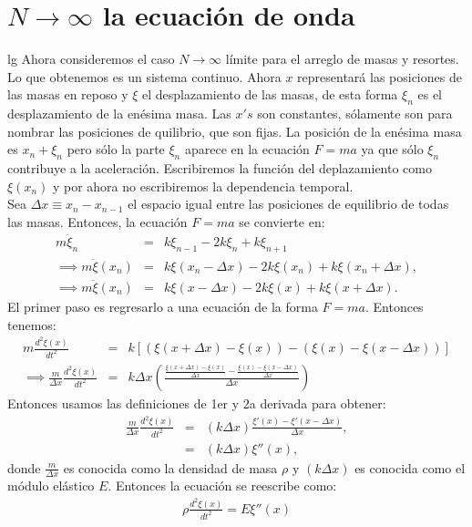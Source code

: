 \documentclass[letterpaper,12pt,oneside]{book}
\begin{document}
\section{\texorpdfstring{$N \to \infty$} y la ecuaci\'on de onda}{lg}
Ahora consideremos el caso $N \to \infty$ l\'imite para el arreglo de masas y resortes. Lo que obtenemos es un sistema continuo. Ahora $x$ representar\'a las posiciones de las masas en reposo y $\xi$ el desplazamiento de las masas, de esta forma $\xi_n$ es el desplazamiento de la en\'esima masa. Las $x's$ son constantes, s\'olamente son para nombrar las posiciones de quilibrio, que son fijas. La posici\'on de la en\'esima masa es $x_n + \xi_n$ pero s\'olo la parte $\xi_n$ aparece en la ecuaci\'on $F=ma$ ya que s\'olo $\xi_n$ contribuye a la aceleraci\'on. Escribiremos la funci\'on del deplazamiento como $\xi(x_n)$ y por ahora no escribiremos la dependencia temporal.\\
Sea $\Delta x \equiv x_n - x_{n-1}$ el espacio igual entre las posiciones de equilibrio de todas las masas. Entonces, la ecuaci\'on $F=ma$ se convierte en:
%
\begin{eqnarray}
m\ddot \xi_n &=& k\xi_{n-1}-2k\xi_n + k\xi_{n+1}\\
\implies m\ddot \xi(x_n) &=& k\xi(x_n-\Delta x)-2k\xi(x_n)+ k\xi(x_n + \Delta x),\\
\implies m\ddot \xi(x_n) &=& k\xi(x-\Delta x)-2k\xi(x)+ k\xi(x + \Delta x).
\end{eqnarray}
%
El primer paso es regresarlo a una ecuaci\'on de la forma $F=ma$. Entonces tenemos:
%
\begin{eqnarray}
m\frac{d^2\xi(x)}{dt^2}&=&k\left[(\xi (x+\Delta x)-\xi(x))-(\xi(x)-\xi(x-\Delta x)) \right]\\
\implies \frac{m}{\Delta x}\frac{d^2\xi(x)}{dt^2}&=&k\Delta x\left(\frac{\frac{\xi(x+\Delta x)-\xi(x)}{\Delta x}-\frac{\xi(x)-\xi(x-\Delta x)}{\Delta x}}{\Delta x} \right)
\end{eqnarray}
%
Entonces usamos las definiciones de 1er y 2a derivada para obtener:
%
\begin{eqnarray}
\frac{m}{\Delta x}\frac{d^2\xi(x)}{dt^2} &=&(k\Delta x)\frac{\xi'(x)-\xi'(x-\Delta x)}{\Delta x},\\
&=&(k\Delta x)\xi''(x),
\end{eqnarray}
%
donde $\frac{m}{\Delta x}$ es conocida como la densidad de masa $\rho$ y $(k\Delta x)$ es conocida como el m\'odulo el\'astico $E$. Entonces la ecuaci\'on se reescribe como:
%
\begin{eqnarray}
\rho \frac{d^2 \xi(x)}{dt^2}=E\xi''(x)
\end{eqnarray}
\end{document}
